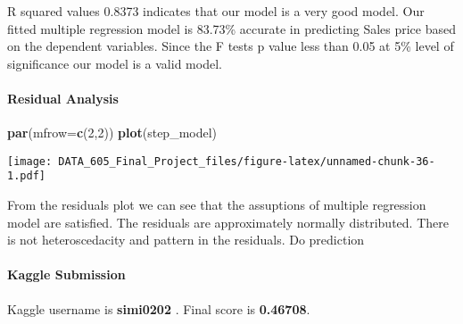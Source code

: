 \documentclass[]{article}
\newenvironment{Shaded}{\begin{snugshade}}{\end{snugshade}}
\newcommand{\DataTypeTok}[1]{\textcolor[rgb]{0.13,0.29,0.53}{#1}}
\newcommand{\DecValTok}[1]{\textcolor[rgb]{0.00,0.00,0.81}{#1}}
\newcommand{\KeywordTok}[1]{\textcolor[rgb]{0.13,0.29,0.53}{\textbf{#1}}}
\newcommand{\NormalTok}[1]{#1}
\newcommand{\OperatorTok}[1]{\textcolor[rgb]{0.81,0.36,0.00}{\textbf{#1}}}
\newcommand{\OtherTok}[1]{\textcolor[rgb]{0.56,0.35,0.01}{#1}}
\newcommand{\StringTok}[1]{\textcolor[rgb]{0.31,0.60,0.02}{#1}}
\let\oldparagraph\paragraph
\renewcommand{\paragraph}[1]{\oldparagraph{#1}\mbox{}}
\begin{document}
R squared values 0.8373 indicates that our model is a very good model.
Our fitted multiple regression model is 83.73\% accurate in predicting
Sales price based on the dependent variables. Since the F tests p value
less than 0.05 at 5\% level of significance our model is a valid model.

\hypertarget{residual-analysis}{%
\paragraph{Residual Analysis}\label{residual-analysis}}

\begin{Shaded}
\begin{Highlighting}[]
\KeywordTok{par}\NormalTok{(}\DataTypeTok{mfrow=}\KeywordTok{c}\NormalTok{(}\DecValTok{2}\NormalTok{,}\DecValTok{2}\NormalTok{))}
\KeywordTok{plot}\NormalTok{(step_model)}
\end{Highlighting}
\end{Shaded}

\texttt{[image: DATA\_605\_Final\_Project\_files/figure-latex/unnamed-chunk-36-1.pdf]}

From the residuals plot we can see that the assuptions of multiple
regression model are satisfied. The residuals are approximately normally
distributed. There is not heteroscedacity and pattern in the residuals.
Do prediction

\begin{Shaded}
\end{Shaded}

\hypertarget{kaggle-submission}{%
\paragraph{Kaggle Submission}\label{kaggle-submission}}

Kaggle username is \textbf{simi0202 }. Final score is \textbf{0.46708}.
\end{document}
